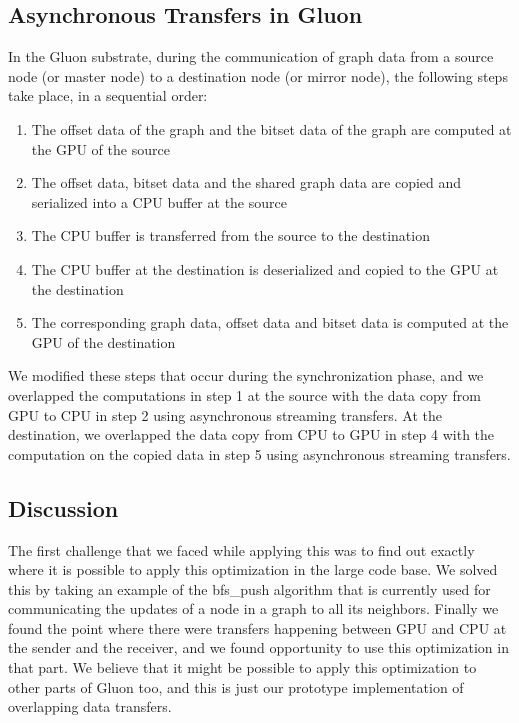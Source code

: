 \subsection{Asynchronous Transfers in Gluon}

In the Gluon substrate, during the communication of graph data from a source node (or master node) to a destination node (or mirror node), the following steps take place, in a sequential order:
\begin{enumerate}
\item The offset data of the graph and the bitset data of the graph are computed at the GPU of the source
\item The offset data, bitset data and the shared graph data are copied and serialized into a CPU buffer at the source
\item The CPU buffer is transferred from the source to the destination
\item The CPU buffer at the destination is deserialized and copied to the GPU at the destination
\item The corresponding graph data, offset data and bitset data is computed at the GPU of the destination
\end{enumerate}

We modified these steps that occur during the synchronization phase, and we overlapped the computations in step 1 at the source with the data copy from GPU to CPU in step 2 using asynchronous streaming transfers. At the destination, we overlapped the data copy from CPU to GPU in step 4 with the computation on the copied data in step 5 using asynchronous streaming transfers. 

\subsection{Discussion}

The first challenge that we faced while applying this was to find out exactly where it is possible to apply this optimization in the large code base. We solved this by taking an example of the bfs\_push algorithm that is currently used for communicating the updates of a node in a graph to all its neighbors. Finally we found the point where there were transfers happening between GPU and CPU at the sender and the receiver, and we found opportunity to use this optimization in that part. We believe that it might be possible to apply this optimization to other parts of Gluon too, and this is just our prototype implementation of overlapping data transfers. 

